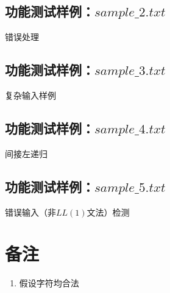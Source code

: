 \documentclass[UTF8]{ctexart}
\begin{document}
\subsection{功能测试样例：$sample\_2.txt$}
错误处理
\subsection{功能测试样例：$sample\_3.txt$}
复杂输入样例
\subsection{功能测试样例：$sample\_4.txt$}
间接左递归
\subsection{功能测试样例：$sample\_5.txt$}
错误输入（非$LL(1)$文法）检测
\section{备注}
\begin{enumerate}
	\item 假设字符均合法
\end{enumerate}
\end{document}
